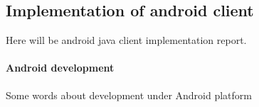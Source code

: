 \newpage
\subsection{Implementation of android client}

Here will be android java client implementation report.
\paragraph{Android development}
Some words about development under Android platform